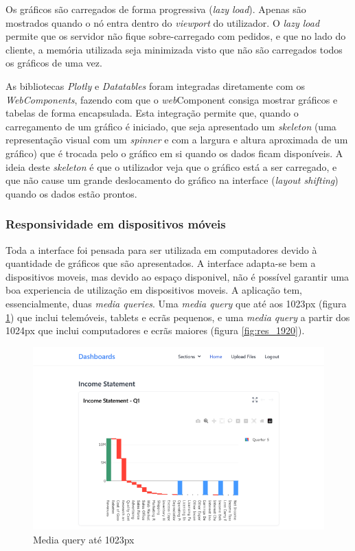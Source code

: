 Os gráficos são carregados de forma progressiva (\textit{lazy load}). Apenas são mostrados quando o nó entra dentro do \textit{viewport} do utilizador. O \textit{lazy load} permite que os servidor não fique sobre-carregado com pedidos, e que no lado do cliente, a memória utilizada seja minimizada visto que não são carregados todos os gráficos de uma vez.	

As bibliotecas \textit{Plotly} e \textit{Datatables} foram integradas diretamente com os \textit{WebComponents}\cite{webcomponents}, fazendo com que o \textit{web}Component consiga mostrar gráficos e tabelas de forma encapsulada. Esta integração permite que, quando o carregamento de um gráfico é iniciado, que seja apresentado  um \textit{skeleton} (uma representação visual com um \textit{spinner} e com a largura e altura aproximada de um gráfico) que é trocada pelo o gráfico em si quando os dados ficam disponíveis. A ideia deste \textit{skeleton} é que o utilizador veja que o gráfico está a ser carregado, e que não cause um grande deslocamento do gráfico na interface (\textit{layout shifting}) quando os dados estão prontos.

\subsubsection{Responsividade em dispositivos móveis}

Toda a interface foi pensada para ser utilizada em computadores devido à quantidade de gráficos que são apresentados. A interface adapta-se bem a dispositivos moveis, mas devido ao espaço disponivel, não é possível garantir uma boa experiencia de utilização em dispositivos moveis. A aplicação tem, essencialmente, duas \textit{media queries}. Uma \textit{media query} que até aos 1023px (figura \ref{fig:res_1023}) que inclui telemóveis, tablets e ecrãs pequenos, e uma \textit{media query} a partir dos 1024px que inclui computadores e ecrãs maiores (figura \ref{fig:res_1920}).

\begin{figure}[htbp]
    \centering
    \includegraphics[max width=\textwidth]{./img/res_1023}
 \caption{Media query até 1023px}
 \label{fig:res_1023}
\end{figure}

